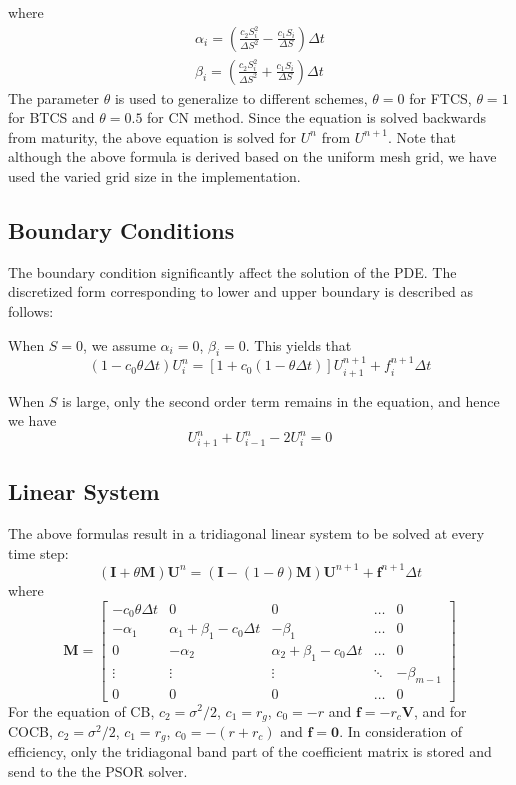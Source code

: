 \documentclass[12pt]{article}
\begin{document}
where
\begin{eqnarray}
\alpha_i = (\frac{c_2S_i^2}{\Delta S^2} - \frac{c_1S_i}{\Delta S})\Delta t\\
\beta_i =  (\frac{c_2S_i^2}{\Delta S^2} + \frac{c_1S_i}{\Delta S})\Delta t
\end{eqnarray}
The parameter $\theta$ is used to generalize to different schemes, $\theta = 0$ for FTCS, $\theta = 1$ for BTCS and $\theta = 0.5$ for CN method. Since the equation is solved backwards from maturity, the above equation is solved for $U^{n}$ from $U^{n+1}$. Note that although the above formula is derived based on the uniform mesh grid, we have used the varied grid size in the implementation.

\subsection{Boundary Conditions}
The boundary condition significantly affect the solution of the PDE. The discretized form corresponding to lower and upper boundary is described as follows:

When $S = 0$, we assume $\alpha_i = 0$, $\beta_i = 0$. This yields that
\begin{equation}
(1 - c_0\theta\Delta t)U_i^n = [1+c_0(1-\theta\Delta t)]U_{i+1}^{n+1} + f_i^{n+1}\Delta t
\end{equation}

When $S$ is large, only the second order term remains in the equation, and hence we have
\begin{equation}
U_{i+1}^n + U_{i-1}^n - 2 U_{i}^n = 0
\end{equation}

\subsection{Linear System}
The above formulas result in a tridiagonal linear system to be solved at every time step:
\begin{equation}
(\mathbf{I} + \theta \mathbf{M}) \mathbf{U}^{n} = (\mathbf{I} - (1-\theta)\mathbf{M})\mathbf{U}^{n+1} + \mathbf{f}^{n+1}\Delta t
\end{equation}
where
\begin{equation}
\mathbf{M} = 
\begin{bmatrix}
-c_0\theta\Delta t         & 0        & 0 		  & \dots & 0\\
-\alpha_1 & \alpha_1 + \beta_1 - c_0\Delta t & -\beta_1 & \dots & 0\\
0         & -\alpha_2  & \alpha_2 + \beta_1 - c_0\Delta t & \dots & 0 \\                 
\vdots & \vdots & \vdots & \ddots & -\beta_{m-1} \\
0 & 0 & 0 & \dots & 0
\end{bmatrix}
\end{equation}
For the equation of CB, $c_2 = \sigma^2/2$, $c_1 = r_g$, $c_0 = -r$ and $\mathbf{f} = -r_c \mathbf{V}$, and for COCB, $c_2 = \sigma^2/2$, $c_1 = r_g$, $c_0 = -(r+r_c)$ and $\mathbf{f} = \mathbf{0}$. In consideration of efficiency, only the tridiagonal band part of the coefficient matrix is stored and send to the the PSOR solver.  
\end{document}
